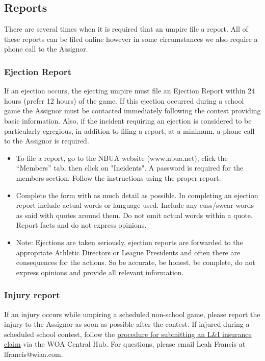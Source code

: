 \documentclass[letterpaper,11pt,colorlinks=true,allcolors=blue]{article}
\begin{document}
\subsection*{Reports} 
There are several times when it is required that an umpire file a report. All of these reports can be filed online however in some circumstances we also require a phone call to the Assignor. 

\subsubsection*{Ejection Report} 
If an ejection occurs, the ejecting umpire must file an Ejection Report within 24 hours (prefer 12 hours) of the game. If this ejection occurred during a school game the Assignor must be contacted immediately following the contest providing basic information. Also, if the incident requiring an ejection is considered to be particularly egregious, in addition to filing a report, at a minimum, a phone call to the Assignor is required.
\begin{itemize}
\item  To file a report, go to the NBUA website (www.nbua.net), click the “Members” tab, then click on "Incidents". A password is required for the members section. Follow the instructions using the proper report.
\item  Complete the form with as much detail as possible. In completing an ejection report include actual words or language used.  Include any cuss/swear words as said with quotes around them.  Do not omit actual words within a quote.  Report facts and do not express opinions.
\item  Note: Ejections are taken seriously, ejection reports are forwarded to the appropriate Athletic Directors or League Presidents and often there are consequences for the actions. So be accurate, be honest, be complete, do not express opinions and provide all relevant information.
\end{itemize}

\subsubsection*{Injury report} 
If an injury occurs while umpiring a scheduled non-school game, please report the injury to the Assignor as soon as possible after the contest. If injured during a scheduled school contest, follow the \href{https://woa.arbitersports.com/front/104759/site/Officials/Insurance/}{procedure for submitting an L\&I insurance claim} via the WOA Central Hub.  For questions, please email Leah Francis at lfrancis@wiaa.com.
\end{document}
